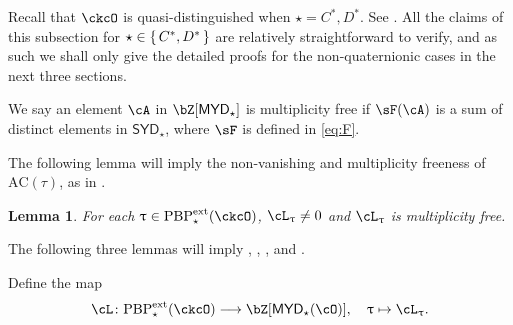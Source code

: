 \documentclass[12pt,a4paper]{amsart}
\newcommand{\AC}{\mathrm{AC}}
\def\SYD{{\mathsf{SYD}}}
\def\MYD{{\mathsf{MYD}}}
\numberwithin{equation}{section}
\newtheorem{lem}[thm]{Lemma}
\theoremstyle{remark}
\def\PBPes{\mathrm{PBP}^{\mathrm{ext}}_{\star}}
\def\cOp{\cO^{\prime}}
\begin{document}
Recall that $\ckcO$ is quasi-distinguished when $\star = C^*, D^*$. See . All the claims of this subsection for $\star\in \set{C^{*},D^{*}}$ are relatively straightforward to verify, and as such we shall only give the detailed proofs for the non-quaternionic cases in the next three sections.

\smallskip


We say an element $\cA$ in $\bZ[\MYD_\star]$ is multiplicity free if $\sF(\cA)$ is a sum of
distinct elements in $\SYD_\star$, where $\sF$ is defined in \eqref{eq:F}.

The following lemma will imply the non-vanishing and multiplicity freeness of
$\AC(\tau)$, as in .

\begin{lem}\label{lem:ac0}
  For each $\uptau\in \PBPes(\ckcO)$,
  $\ac_{\uptau}\neq 0$ and $\ac_\uptau$ is multiplicity free.
\end{lem}

\smallskip

The following three lemmas will imply , , , and
.

Define the map
  \[
      \acm \colon
      \PBPes( \ckcO )\longrightarrow \bZ[\MYD_{\star}(\cO)],
      \quad \uptau\mapsto \ac_{\uptau}.
    \]
\end{document}
